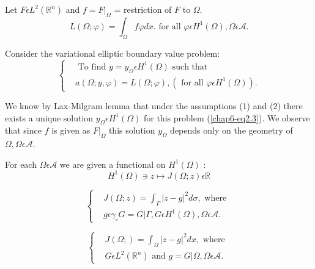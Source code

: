 \begin{example}\label{chap6-exam2.2}
Let $F \epsilon L^{2} (\mathbb{R}^{n})$ and $f = F |_\Omega$ = restriction of $F$ to $\Omega$.
$$
L(\Omega ; \varphi) = \int_{\Omega} f\varphi dx. \text{ for all }
\varphi \epsilon H^{1} (\Omega), \Omega \epsilon \mathscr{A}. 
$$

Consider the variational elliptic boundary value problem:
\begin{equation*}
\begin{cases}
& \text{ To find } y = y_{\Omega} \epsilon H^{1} (\Omega) \text{ such that }\\
& a(\Omega ; y, \varphi) = L(\Omega ; \varphi), (\text{ for all } \varphi \epsilon H^{1} (\Omega)).\tag{2.3}\label{chap6-eq2.3}
\end{cases}
\end{equation*}
\end{example}

We know by Lax-Milgram lemma that under the assumptions (1) and (2)
there exists a unique solution $y_{\Omega} \epsilon H^{1} (\Omega)$
for this problem (\ref{chap6-eq2.3}). We observe that since $f$ is given
as $F |_{\Omega}$ this solution $y_{\Omega}$ depends only on the
geometry of $\Omega, \Omega \epsilon \mathscr{A}$. 

 For each $\Omega \epsilon \mathscr{A}$ we are
given a functional on $H^{1} (\Omega)$ : 
\begin{equation*}
H^{1} (\Omega) \ni z \mapsto J(\Omega ; z) \epsilon \mathbb{R}\tag{2.4}\label{chap6-eq2.4}
\end{equation*}

\begin{example}\label{chap6-exam2.3}
\begin{equation*}
\begin{cases}
& J(\Omega ; z) = \int_{\Gamma} |z-g|^{2} d \sigma, \text{ where }\\
& g \epsilon \gamma_{\circ} G = G | \Gamma, G \epsilon H^{1} (\Omega), \Omega \epsilon \mathscr{A}.
\end{cases}
\end{equation*}
\end{example}

\begin{example}\label{chap6-exam2.4}
\begin{equation*}
\begin{cases}
& J(\Omega ; ) = \int_{\Omega} |z-g|^{2} dx, \text{ where }\\
& G \epsilon L^{2} (\mathbb{R}^{n}) \text{ and } g = G | \Omega, \Omega \epsilon \mathscr{A}.
\end{cases}
\end{equation*}
\end{example}


